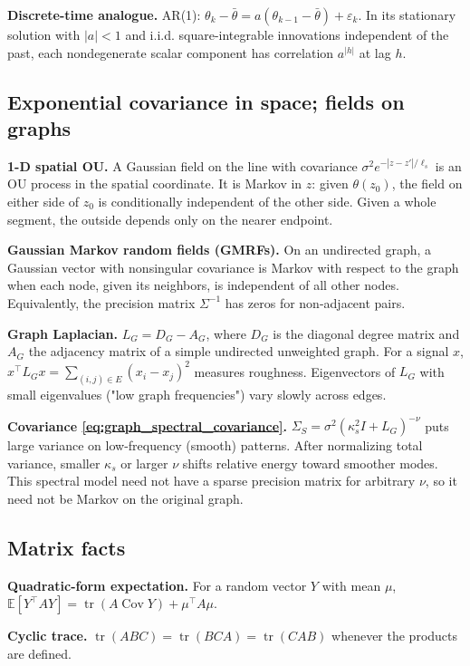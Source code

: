 \textbf{Discrete-time analogue.} AR(1): $\theta_k-\bar\theta=a(\theta_{k-1}-\bar\theta)+\varepsilon_k$. In its stationary solution with $|a|<1$ and i.i.d. square-integrable
innovations independent of the past, each nondegenerate scalar component
has correlation $a^{|h|}$ at lag $h$.

\subsection{Exponential covariance in space; fields on graphs}
\label{app:toolkit-5}
\textbf{1-D spatial OU.} A Gaussian field on the line with covariance $\sigma^2e^{-|z-z'|/\ell_s}$ is an OU process in the spatial coordinate. It is Markov in $z$: given $\theta(z_0)$, the field on either side of $z_0$ is conditionally independent of the other side. Given a whole segment, the outside depends only on the nearer endpoint.

\textbf{Gaussian Markov random fields (GMRFs).} On an undirected graph, a Gaussian vector with nonsingular covariance is Markov with respect to the graph when each node, given its neighbors, is independent of all other nodes. Equivalently, the precision matrix $\Sigma^{-1}$ has zeros for non-adjacent pairs.

\textbf{Graph Laplacian.} $L_G=D_G-A_G$, where $D_G$ is the diagonal degree matrix and $A_G$ the adjacency
matrix of a simple undirected unweighted graph. For a signal $x$, $x^\top L_Gx=\sum_{(i,j)\in E}(x_i-x_j)^2$ measures roughness. Eigenvectors of $L_G$ with small eigenvalues ("low graph frequencies") vary slowly across edges.

\textbf{Covariance \eqref{eq:graph_spectral_covariance}.} $\Sigma_S=\sigma^2(\kappa_s^2I+L_G)^{-\nu}$ puts large variance on low-frequency (smooth) patterns. After normalizing total variance, smaller $\kappa_s$ or larger $\nu$ shifts
relative energy toward smoother modes. This spectral model need not have a
sparse precision matrix for arbitrary $\nu$, so it need not be Markov on
the original graph.

\subsection{Matrix facts}
\label{app:toolkit-6}
\textbf{Quadratic-form expectation.} For a random vector $Y$ with mean $\mu$, $\mathbb E[Y^\top AY]=\operatorname{tr}(A\operatorname{Cov}Y)+\mu^\top A\mu$.

\textbf{Cyclic trace.} $\operatorname{tr}(ABC)=\operatorname{tr}(BCA)=\operatorname{tr}(CAB)$ whenever the products are defined.

